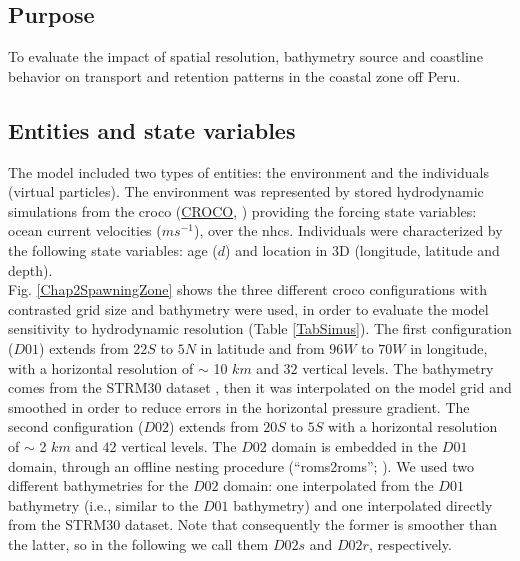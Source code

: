 \subsection{Purpose}\label{Chap2MethPurp}

To evaluate the impact of spatial resolution, bathymetry source and coastline behavior on transport and retention patterns in the coastal zone off Peru.\\

\subsection{Entities and state variables}\label{Chap2MethEnti}

The model included two types of entities: the environment and the individuals (virtual particles). The environment was represented by stored hydrodynamic simulations from the \acrlong{croco} (\href{https://www.croco-ocean.org/}{CROCO}, \cite{HiltAucl2020,ShchMcwi2005}) providing the forcing state variables: ocean current velocities ($ms^{-1}$), over the \acrshort{nhcs}. Individuals were characterized by the following state variables: age ($d$) and location in 3D (longitude, latitude and depth).\\

Fig. \ref{Chap2SpawningZone} shows the three different \acrshort{croco} configurations with contrasted grid size and bathymetry were used, in order to evaluate the model sensitivity to hydrodynamic resolution (Table \ref{TabSimus}). The first configuration ($D01$) extends from $22$\textdegree $S$ to $5$\textdegree $N$ in latitude and from $96$\textdegree $W$ to $70$\textdegree $W$ in longitude, with a horizontal resolution of $\sim$ 10 $km$ and $32$ vertical levels. The bathymetry comes from the STRM30 dataset \citep{BeckSand2009}, then it was interpolated on the model grid and smoothed in order to reduce errors in the horizontal pressure gradient. The second configuration ($D02$) extends from $20$\textdegree $S$ to $5$\textdegree $S$ with a horizontal resolution of $\sim$ 2 $km$ and $42$ vertical levels. The $D02$ domain is embedded in the $D01$ domain, through an offline nesting procedure (``roms2roms''; \cite{MasoMole2010}). We used two different bathymetries for the $D02$ domain: one interpolated from the $D01$ bathymetry (i.e., similar to the $D01$ bathymetry) and one interpolated directly from the STRM30 dataset. Note that consequently the former is smoother than the latter, so in the following we call them $D02s$ and $D02r$, respectively.\\

